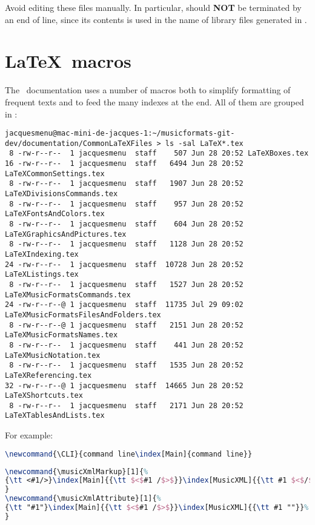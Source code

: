 Avoid editing these files manually. In particular,  should {\bf NOT} be terminated by an end of line, since its contents is used in the name of library files generated in .


\section{\LaTeX\ macros}

The \mf\ documentation uses a number of macros both to simplify formatting of frequent texts and to feed the many indexes at the end. All of them are grouped in :
\begin{lstlisting}[language=Terminal]
jacquesmenu@mac-mini-de-jacques-1:~/musicformats-git-dev/documentation/CommonLaTeXFiles > ls -sal LaTeX*.tex
 8 -rw-r--r--  1 jacquesmenu  staff    507 Jun 28 20:52 LaTeXBoxes.tex
16 -rw-r--r--  1 jacquesmenu  staff   6494 Jun 28 20:52 LaTeXCommonSettings.tex
 8 -rw-r--r--  1 jacquesmenu  staff   1907 Jun 28 20:52 LaTeXDivisionsCommands.tex
 8 -rw-r--r--  1 jacquesmenu  staff    957 Jun 28 20:52 LaTeXFontsAndColors.tex
 8 -rw-r--r--  1 jacquesmenu  staff    604 Jun 28 20:52 LaTeXGraphicsAndPictures.tex
 8 -rw-r--r--  1 jacquesmenu  staff   1128 Jun 28 20:52 LaTeXIndexing.tex
24 -rw-r--r--  1 jacquesmenu  staff  10728 Jun 28 20:52 LaTeXListings.tex
 8 -rw-r--r--  1 jacquesmenu  staff   1527 Jun 28 20:52 LaTeXMusicFormatsCommands.tex
24 -rw-r--r--@ 1 jacquesmenu  staff  11735 Jul 29 09:02 LaTeXMusicFormatsFilesAndFolders.tex
 8 -rw-r--r--@ 1 jacquesmenu  staff   2151 Jun 28 20:52 LaTeXMusicFormatsNames.tex
 8 -rw-r--r--  1 jacquesmenu  staff    441 Jun 28 20:52 LaTeXMusicNotation.tex
 8 -rw-r--r--  1 jacquesmenu  staff   1535 Jun 28 20:52 LaTeXReferencing.tex
32 -rw-r--r--@ 1 jacquesmenu  staff  14665 Jun 28 20:52 LaTeXShortcuts.tex
 8 -rw-r--r--  1 jacquesmenu  staff   2171 Jun 28 20:52 LaTeXTablesAndLists.tex
\end{lstlisting}

For example:
\begin{lstlisting}[language=Latex]
\newcommand{\CLI}{command line\index[Main]{command line}}
\end{lstlisting}

\begin{lstlisting}[language=Latex]
\newcommand{\musicXmlMarkup}[1]{%
{\tt <#1/>}\index[Main]{{\tt $<$#1 /$>$}}\index[MusicXML]{{\tt #1 $<$/$>$}}%
}
\newcommand{\musicXmlAttribute}[1]{%
{\tt "#1"}\index[Main]{{\tt $<$#1 /$>$}}\index[MusicXML]{{\tt #1 ""}}%
}
\end{lstlisting}

